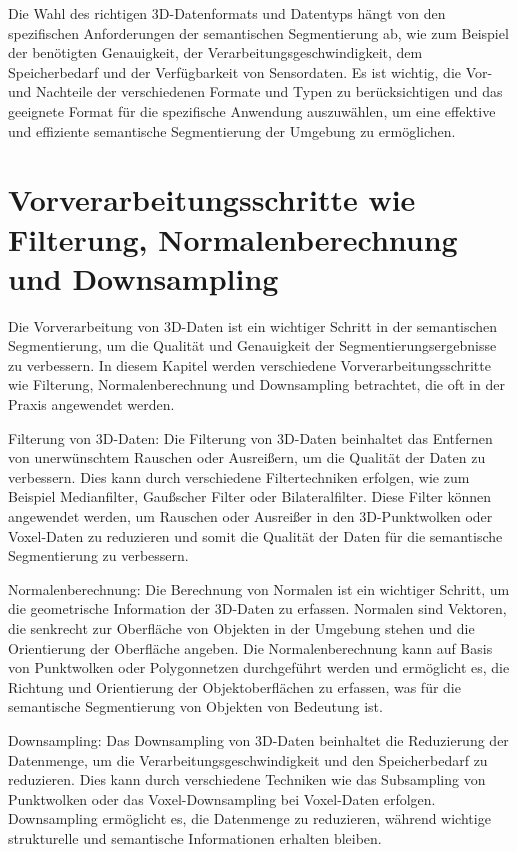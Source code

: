 Die Wahl des richtigen 3D-Datenformats und Datentyps hängt von den spezifischen
Anforderungen der semantischen Segmentierung ab, wie zum Beispiel der
benötigten Genauigkeit, der Verarbeitungsgeschwindigkeit, dem Speicherbedarf
und der Verfügbarkeit von Sensordaten. Es ist wichtig, die Vor- und Nachteile
der verschiedenen Formate und Typen zu berücksichtigen und das geeignete Format
für die spezifische Anwendung auszuwählen, um eine effektive und effiziente
semantische Segmentierung der Umgebung zu ermöglichen.

\section{Vorverarbeitungsschritte wie Filterung, Normalenberechnung und Downsampling}

Die Vorverarbeitung von 3D-Daten ist ein wichtiger Schritt in der semantischen
Segmentierung, um die Qualität und Genauigkeit der Segmentierungsergebnisse zu
verbessern. In diesem Kapitel werden verschiedene Vorverarbeitungsschritte wie
Filterung, Normalenberechnung und Downsampling betrachtet, die oft in der
Praxis angewendet werden.

Filterung von 3D-Daten: Die Filterung von 3D-Daten beinhaltet das Entfernen von
unerwünschtem Rauschen oder Ausreißern, um die Qualität der Daten zu
verbessern. Dies kann durch verschiedene Filtertechniken erfolgen, wie zum
Beispiel Medianfilter, Gaußscher Filter oder Bilateralfilter. Diese Filter
können angewendet werden, um Rauschen oder Ausreißer in den 3D-Punktwolken oder
Voxel-Daten zu reduzieren und somit die Qualität der Daten für die semantische
Segmentierung zu verbessern.

Normalenberechnung: Die Berechnung von Normalen ist ein wichtiger Schritt, um
die geometrische Information der 3D-Daten zu erfassen. Normalen sind Vektoren,
die senkrecht zur Oberfläche von Objekten in der Umgebung stehen und die
Orientierung der Oberfläche angeben. Die Normalenberechnung kann auf Basis von
Punktwolken oder Polygonnetzen durchgeführt werden und ermöglicht es, die
Richtung und Orientierung der Objektoberflächen zu erfassen, was für die
semantische Segmentierung von Objekten von Bedeutung ist.

Downsampling: Das Downsampling von 3D-Daten beinhaltet die Reduzierung der
Datenmenge, um die Verarbeitungsgeschwindigkeit und den Speicherbedarf zu
reduzieren. Dies kann durch verschiedene Techniken wie das Subsampling von
Punktwolken oder das Voxel-Downsampling bei Voxel-Daten erfolgen. Downsampling
ermöglicht es, die Datenmenge zu reduzieren, während wichtige strukturelle und
semantische Informationen erhalten bleiben.

